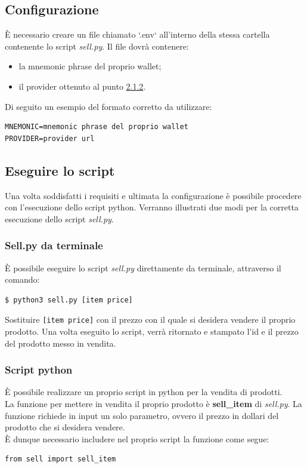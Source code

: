 \documentclass[a4paper, 12pt]{article}
\begin{document}
\subsection{Configurazione}
È necessario creare un file chiamato `.env` all'interno della stessa cartella contenente lo script \textit{sell.py}. Il file dovrà contenere:
\begin{itemize}
  \item la mnemonic phrase del proprio wallet;
  \item il provider ottenuto al punto \hyperref[sec:provider]{2.1.2}.
\end{itemize}
Di seguito un esempio del formato corretto da utilizzare:
\begin{verbatim}
MNEMONIC=mnemonic phrase del proprio wallet
PROVIDER=provider url
\end{verbatim}
\subsection{Eseguire lo script}
Una volta soddisfatti i requisiti e ultimata la configurazione è possibile procedere con l'esecuzione dello script python. Verranno illustrati due modi per la corretta esecuzione dello script \textit{sell.py}.
\subsubsection{Sell.py da terminale}
È possibile eseguire lo script \textit{sell.py} direttamente da terminale, attraverso il comando:
\begin{lstlisting}[language=bash]
  $ python3 sell.py [item price]
\end{lstlisting}
Sostituire \verb|[item price]| con il prezzo con il quale si desidera vendere il proprio prodotto.
Una volta eseguito lo script, verrà ritornato e stampato l'id e il prezzo del prodotto messo in vendita.
\subsubsection{Script python}
È possibile realizzare un proprio script in python per la vendita di prodotti.\\
La funzione per mettere in vendita il proprio prodotto è \textbf{sell\_item} di \textit{sell.py}. La funzione richiede in input un solo parametro, ovvero il prezzo in dollari del prodotto che si desidera vendere.\\
È dunque necessario includere nel proprio script la funzione come segue:
\begin{verbatim}
from sell import sell_item
\end{verbatim}
\end{document}
